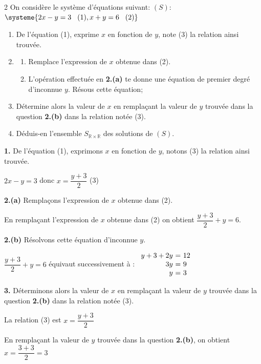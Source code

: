 \begin{multicols*}{2}
  	On considère le système d’équations suivant: $(S)$: $\systeme{2x-y=3 \hspace{0.3cm} (1), x+y=6 \hspace{0.3cm} (2)}$
  	\begin{enumerate} 
  		\item De l'équation (1), exprime $x$ en fonction de $y$, note (3) la relation ainsi trouvée.
  		\item 
  		\begin{enumerate}
  			\item  Remplace l'expression de $x$ obtenue dans (2).
  			\item L'opération effectuée en \textbf{2.(a)} te donne une équation de premier degré d'inconnue $y$. Résous cette équation; 
  		\end{enumerate}
  		\item Détermine alors la valeur de $x$ en remplaçant la valeur de $y$ trouvée dans la question \textbf{2.(b)} dans la relation notée (3). 
  		\item  Déduis-en l'ensemble $S_{\mathbb{R}\times \mathbb{R}}$  des solutions de $(S)$.
  	\end{enumerate}
  	\dure
  	\resul
  	\textbf{1.} De l'équation (1), exprimons $x$ en fonction de $y$, notons (3) la relation ainsi trouvée.
  	
  	$2x-y=3$ donc $x=\dfrac{y+3}{2}$ (3)
  	
  	\textbf{2.(a)} Remplaçons l'expression de $x$ obtenue dans (2).
  	
  	En remplaçant l'expression de $x$ obtenue dans (2) on obtient $\dfrac{y+3}{2}+y=6$.
  	
  	\textbf{2.(b)} Résolvons cette équation d'inconnue $y$.
  	
  	$\dfrac{y+3}{2}+y=6$ équivaut successivement à :
  	$\begin{array}{r@{\ =\ }l} 
  		y+3+2y&12\\
  		3y	& 9 \\ 	
  		y	&3 \\ 
  	\end{array}$  
  	
  	\textbf{3.} Déterminons alors la valeur de $x$ en remplaçant la valeur de $y$ trouvée dans la question \textbf{2.(b)} dans la relation notée (3).
  	
  	La relation (3) est   $x=\dfrac{y+3}{2}$
  	
  	En remplaçant la valeur de $y$ trouvée dans la question \textbf{2.(b)}, on obtient $x=\dfrac{3+3}{2}=3$ 
  	

\end{multicols*}
